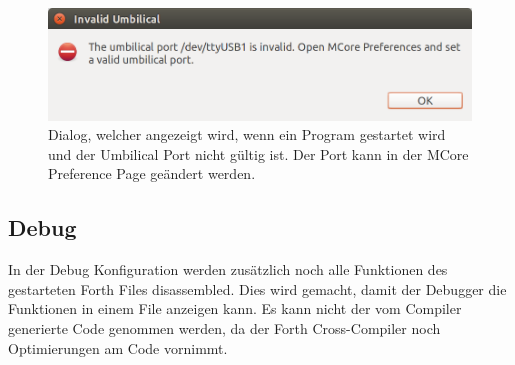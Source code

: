 \begin{figure}[H]
	\centering
		\includegraphics[scale=0.4]{launch/invalidumbilical.png}
		\caption{Dialog, welcher angezeigt wird, wenn ein Program gestartet wird und der Umbilical Port nicht gültig ist. Der Port kann in der MCore Preference Page geändert werden.}
		\label{fig:invalidumbilical}
\end{figure}

\subsection{Debug}

In der Debug Konfiguration werden zusätzlich noch alle Funktionen des gestarteten Forth Files disassembled. Dies wird gemacht, damit der Debugger die Funktionen in einem File anzeigen kann. Es kann nicht der vom Compiler generierte Code genommen werden, da der Forth Cross-Compiler noch Optimierungen am Code vornimmt.

